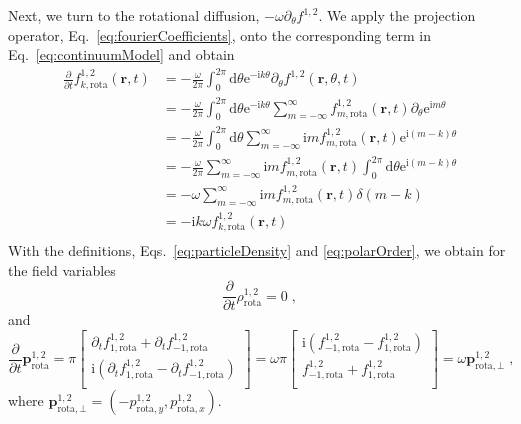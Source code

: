 \documentclass{article}
\begin{document}
Next, we turn to the rotational diffusion, $-\omega \partial _{\theta}f^{1,2}$. We apply the projection operator, Eq.~\eqref{eq:fourierCoefficients}, onto the corresponding term in Eq.~\eqref{eq:continuumModel} and obtain
\begin{equation}
    \begin{aligned}
        \frac{\partial}{\partial t}f_{k,\mathrm{rota}}^{1,2}\left( \mathbf{r},t \right) &=-\frac{\omega}{2\pi}\int_0^{2\pi}{\mathrm{d}\theta \mathrm{e}^{-\mathrm{i}k\theta}\partial _{\theta}f^{1,2}\left( \mathbf{r},\theta ,t \right)}\\
        &=-\frac{\omega}{2\pi}\int_0^{2\pi}{\mathrm{d}\theta \mathrm{e}^{-\mathrm{i}k\theta}\sum_{m=-\infty}^{\infty}{f_{m,\mathrm{rota}}^{1,2}\left( \mathbf{r},t \right) \partial _{\theta}\mathrm{e}^{\mathrm{i}m\theta}}}\\
        &=-\frac{\omega}{2\pi}\int_0^{2\pi}{\mathrm{d}\theta \sum_{m=-\infty}^{\infty}{\mathrm{i}mf_{m,\mathrm{rota}}^{1,2}\left( \mathbf{r},t \right) \mathrm{e}^{\mathrm{i}\left( m-k \right) \theta}}}\\
        &=-\frac{\omega}{2\pi}\sum_{m=-\infty}^{\infty}{\mathrm{i}mf_{m,\mathrm{rota}}^{1,2}\left( \mathbf{r},t \right) \int_0^{2\pi}{\mathrm{d}\theta}\mathrm{e}^{\mathrm{i}\left( m-k \right) \theta}}\\
        &=-\omega \sum_{m=-\infty}^{\infty}{\mathrm{i}mf_{m,\mathrm{rota}}^{1,2}\left( \mathbf{r},t \right) \delta \left( m-k \right)}\\
        &=-\mathrm{i}k\omega f_{k,\mathrm{rota}}^{1,2}\left( \mathbf{r},t \right)\\
    \end{aligned}
\end{equation}
With the definitions, Eqs.~\eqref{eq:particleDensity} and \eqref{eq:polarOrder}, we obtain for the field variables
\begin{equation}
    \frac{\partial}{\partial t}\rho _{\mathrm{rota}}^{1,2}=0\;,
\end{equation}
and
\begin{equation}
    \frac{\partial}{\partial t}\boldsymbol{p}_{\mathrm{rota}}^{1,2}=\pi \left[ \begin{array}{c}
        \partial _tf_{1,\mathrm{rota}}^{1,2}+\partial _tf_{-1,\mathrm{rota}}^{1,2}\\
        \mathrm{i}\left( \partial _tf_{1,\mathrm{rota}}^{1,2}-\partial _tf_{-1,\mathrm{rota}}^{1,2} \right)\\
    \end{array} \right] =\omega \pi \left[ \begin{array}{c}
        \mathrm{i}\left( f_{-1,\mathrm{rota}}^{1,2}-f_{1,\mathrm{rota}}^{1,2} \right)\\
        f_{-1,\mathrm{rota}}^{1,2}+f_{1,\mathrm{rota}}^{1,2}\\
    \end{array} \right] =\omega \boldsymbol{p}_{\mathrm{rota},\bot}^{1,2}\;,
\end{equation}
where $\boldsymbol{p}_{\mathrm{rota},\bot}^{1,2}=\left( -p_{\mathrm{rota},y}^{1,2},p_{\mathrm{rota},x}^{1,2} \right)$.
\end{document}
